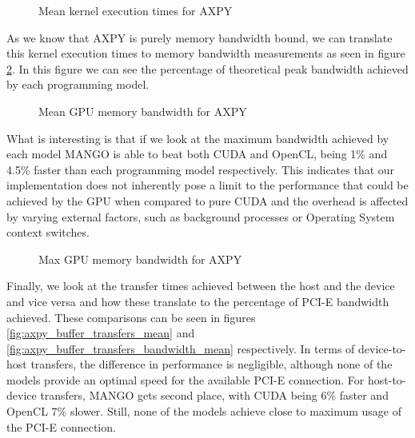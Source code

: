 \begin{figure}
    \centering
    \resizebox{!}{160pt}{
        
    }
    \captionsetup{justification=centering}
    \caption{Mean kernel execution times for AXPY}
    \label{fig:axpy_kernel_executions_mean}
\end{figure}

As we know that AXPY is purely memory bandwidth bound, we can translate this kernel execution times to memory bandwidth measurements as seen in figure \ref{fig:axpy_bandwidth_mean}. In this figure we can see the percentage of theoretical peak bandwidth achieved by each programming model.

\begin{figure}
    \centering
    \resizebox{!}{160pt}{
        
    }
    \captionsetup{justification=centering}
    \caption{Mean GPU memory bandwidth for AXPY}
    \label{fig:axpy_bandwidth_mean}
\end{figure}

What is interesting is that if we look at the maximum bandwidth achieved by each model MANGO is able to beat both CUDA and OpenCL, being 1\% and 4.5\% faster than each programming model respectively. This indicates that our implementation does not inherently pose a limit to the performance that could be achieved by the GPU when compared to pure CUDA and the overhead is affected by varying external factors, such as background processes or Operating System context switches. 

\begin{figure}
    \centering
    \resizebox{!}{160pt}{
        
    }
    \captionsetup{justification=centering}
    \caption{Max GPU memory bandwidth for AXPY}
    \label{fig:axpy_bandwidth_max}
\end{figure}

Finally, we look at the transfer times achieved between the host and the device and vice versa and how these translate to the percentage of PCI-E bandwidth achieved. These comparisons can be seen in figures \ref{fig:axpy_buffer_transfers_mean} and \ref{fig:axpy_buffer_transfers_bandwidth_mean} respectively. In terms of device-to-host transfers, the difference in performance is negligible, although none of the models provide an optimal speed for the available PCI-E connection. For host-to-device transfers, MANGO gets second place, with CUDA being 6\% faster and OpenCL 7\% slower. Still, none of the models achieve close to maximum usage of the PCI-E connection.

